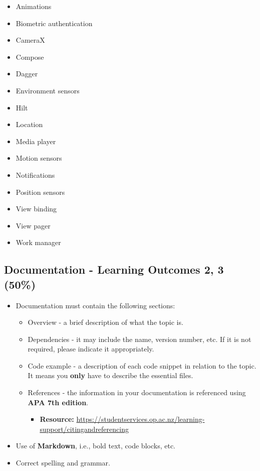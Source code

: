 \documentclass{article}
\begin{document}
\begin{itemize}
	\item Animations
	\item Biometric authentication
	\item CameraX
	\item Compose
	\item Dagger
	\item Environment sensors
	\item Hilt
	\item Location
	\item Media player
	\item Motion sensors
	\item Notifications
	\item Position sensors
	\item View binding
	\item View pager
	\item Work manager
\end{itemize}

\subsection*{Documentation - Learning Outcomes 2, 3 (50\%)}
\begin{itemize}
	\item Documentation must contain the following sections:
	      \begin{itemize}
		      \item Overview - a brief description of what the topic is.
		      \item Dependencies - it may include the name, version number, etc. If it is not required, please indicate it appropriately.
		      \item Code example - a description of each code snippet in relation to the topic. It means you \textbf{only} have to describe the essential files.
		      \item References - the information in your documentation is referenced using \textbf{APA 7th edition}.
		            \begin{itemize}
			            \item \textbf{Resource:} \href{https://studentservices.op.ac.nz/learning-support/citingandreferencing}{https://studentservices.op.ac.nz/learning-support/citingandreferencing}
		            \end{itemize}
	      \end{itemize}
	\item Use of \textbf{Markdown}, i.e., bold text, code blocks, etc.
	\item Correct spelling and grammar.
\end{itemize}
\end{document}
